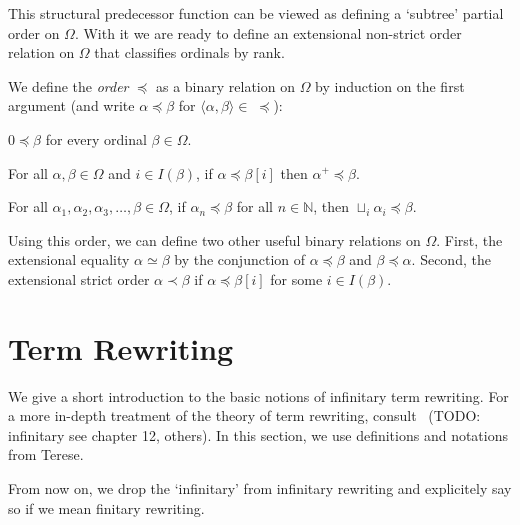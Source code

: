 
This structural predecessor function can be viewed as defining a `subtree'
partial order on $\Omega$. With it we are ready to define an extensional
non-strict order relation on $\Omega$ that classifies ordinals by rank.

\begin{definition}[Order]\label{def:order}
We define the \emph{order} $\preceq$ as a binary relation on $\Omega$ by
induction on the first argument (and write $\alpha \preceq \beta$ for $\langle
\alpha, \beta \rangle \in \; \preceq$):
\begin{compactenum}
  \item
    $0 \preceq \beta$ for every ordinal $\beta \in \Omega$.
  \item
    For all $\alpha, \beta \in \Omega$ and $i \in I(\beta)$, if $\alpha
    \preceq \beta[i]$ then $\alpha^+ \preceq \beta$.
  \item
    For all $\alpha_1, \alpha_2, \alpha_3, \ldots, \beta \in \Omega$, if
    $\alpha_n \preceq \beta$ for all $n \in \mathbb{N}$, then $\sqcup_i
    \alpha_i \preceq \beta$.
\end{compactenum}
\end{definition}

Using this order, we can define two other useful binary relations on
$\Omega$. First, the extensional equality $\alpha \simeq \beta$ by the
conjunction of $\alpha \preceq \beta$ and $\beta \preceq \alpha$. Second, the
extensional strict order $\alpha \prec \beta$ if $\alpha \preceq \beta[i]$ for
some $i \in I(\beta)$.


\section{Term Rewriting}\label{sec:rewriting}


We give a short introduction to the basic notions of infinitary term
rewriting. For a more in-depth treatment of the theory of term rewriting,
consult~\cite{terese-03} (TODO: infinitary see chapter 12, others). In this
section, we use definitions and notations from Terese.

From now on, we drop the `infinitary' from infinitary rewriting and
explicitely say so if we mean finitary rewriting.


